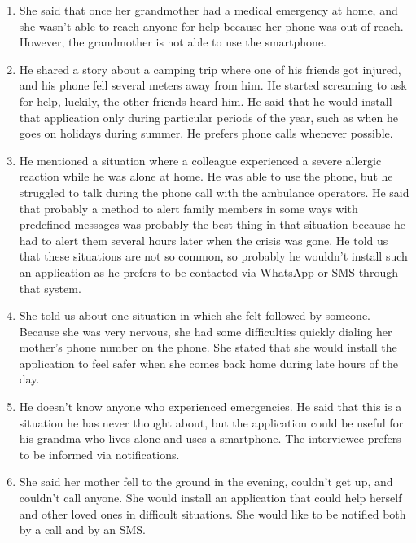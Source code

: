 \documentclass[12pt]{article}
\begin{document}
\begin{enumerate}
    \item She said that once her grandmother had a medical emergency at 
    home, and she wasn't able to reach anyone for help because her phone 
    was out of reach. However, the grandmother is not able to use the 
    smartphone.
    
    \item He shared a story about a camping trip where one of his friends got 
    injured, and his phone fell several meters away from him. He started screaming 
    to ask for help, luckily, the other friends heard him. He said that he would 
    install that application only during particular periods of the year, such as when 
    he goes on holidays during summer. He prefers phone calls whenever possible.
    
    \item He mentioned a situation where a colleague experienced a severe allergic 
    reaction while he was alone at home. He was able to use the phone, but he 
    struggled to talk during the phone call with the ambulance operators. He said 
    that probably a method to alert family members in some ways with predefined 
    messages was probably the best thing in that situation because he had to alert 
    them several hours later when the crisis was gone. He told us that these 
    situations are not so common, so probably he wouldn't install such an application 
    as he prefers to be contacted via WhatsApp or SMS through that system.
    
    \item She told us about one situation in which she felt followed by someone. 
    Because she was very nervous, she had some difficulties quickly dialing her 
    mother's phone number on the phone. She stated that she would install the 
    application to feel safer when she comes back home during late hours of the day.
    
    \item He doesn't know anyone who experienced emergencies. He said that this is a 
    situation he has never thought about, but the application could be useful for his 
    grandma who lives alone and uses a smartphone. The interviewee prefers to be 
    informed via notifications.

    \item She said her mother fell to the ground in the evening, couldn't get up, and couldn't call anyone. She would install an application that could help herself and other loved ones in difficult situations. She would like to be notified both by a call and by an SMS.
    

\end{enumerate}
\end{document}
